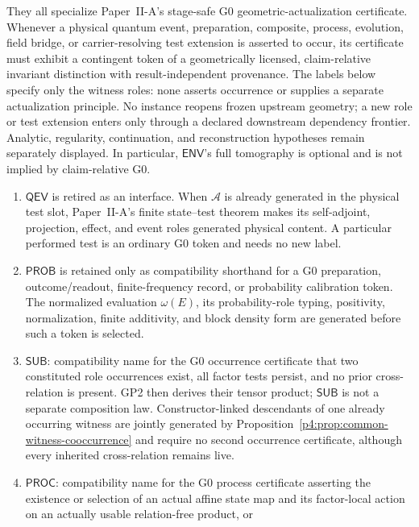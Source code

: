 \documentclass[12pt,a4paper]{article}
\begin{document}
They all specialize Paper~II-A's stage-safe G0 geometric-actualization
certificate.  Whenever a physical quantum event, preparation, composite,
process, evolution, field bridge, or carrier-resolving test extension is
asserted to occur, its certificate must exhibit a contingent token of a
geometrically licensed, claim-relative invariant distinction with
result-independent provenance.  The labels below specify only the witness
roles: none asserts occurrence or supplies a separate actualization principle.
No instance reopens frozen upstream geometry; a new role or test extension
enters only through a declared downstream dependency frontier.  Analytic,
regularity, continuation, and reconstruction hypotheses remain separately
displayed.  In particular, \(\mathsf{ENV}\)'s full tomography is optional and
is not implied by claim-relative G0.
\begin{enumerate}[label=(\roman*), leftmargin=2.3em]
\item \(\mathsf{QEV}\) is retired as an interface.  When \(\mathcal A\) is
      already generated in the physical test slot, Paper~II-A's finite
      state--test theorem makes its self-adjoint, projection, effect, and
      event roles generated physical content.  A particular performed test is
      an ordinary G0 token and needs no new label.
\item \(\mathsf{PROB}\) is retained only as compatibility shorthand for a G0
      preparation, outcome/readout, finite-frequency record, or probability
      calibration token.  The normalized evaluation \(\omega(E)\), its
      probability-role typing, positivity, normalization, finite additivity,
      and block density form are generated before such a token is selected.
\item \(\mathsf{SUB}\): compatibility name for the G0 occurrence certificate
      that two constituted role occurrences exist, all factor tests persist,
      and no prior cross-relation is present.  GP2 then derives their tensor
      product; \(\mathsf{SUB}\) is not a separate composition law.
      Constructor-linked descendants of one already occurring witness are
      jointly generated by
      Proposition~\ref{p4:prop:common-witness-cooccurrence} and require no
      second occurrence certificate, although every inherited cross-relation
      remains live.
\item \(\mathsf{PROC}\): compatibility name for the G0 process certificate
      asserting the existence or selection of an actual affine state map and
      its factor-local action on an actually usable relation-free product, or

\end{enumerate}
\end{document}
